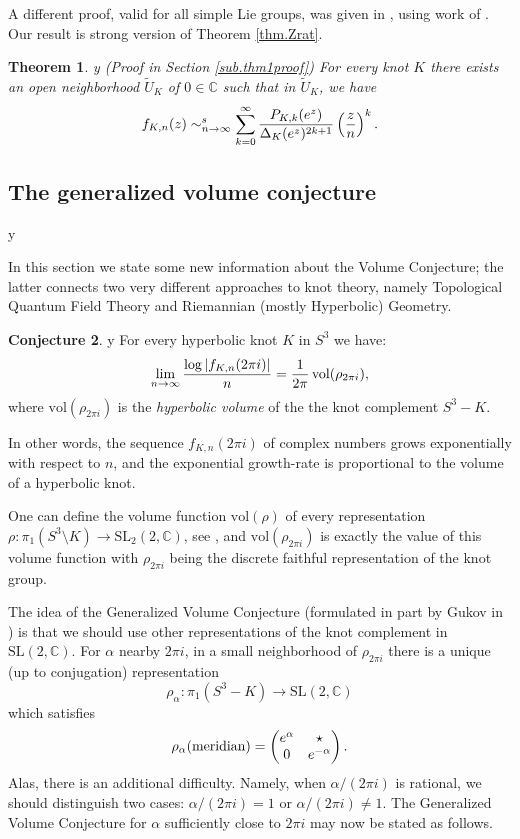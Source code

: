 \documentclass{amsart}
\newtheorem{theorem}{Theorem}[section]
\theoremstyle{definition}
\newtheorem{conjecture}[theorem]{Conjecture}
\def\printname#1{
    \if\draft y
        \smash{\makebox[0pt]{\hspace{-0.5in}
            \raisebox{8pt}{\tt\tiny #1}}}
    \fi
}
\def\lbl#1{\label{#1}\printname{#1}}
\def\BC{\mathbb C}
\def\D{\Delta}
\def\a{\alpha}
\def\mat#1#2#3#4{\left(
\begin{matrix}
 #1 & #2  \\
 #3 & #4
\end{matrix}
\right)}
\def\longto{\longrightarrow}
\def\SL{\mathrm{SL}}
\def\vol{\mathrm{vol}}
\begin{document}
A different proof, valid for all simple Lie groups, was given in \cite{Ga1},
using work of \cite{GK}. Our result is strong version of Theorem
\ref{thm.Zrat}.

\begin{theorem}
\lbl{thm.1} {\rm (Proof in Section \ref{sub.thm1proof})}
For every knot $K$ there exists an open neighborhood
$\tilde U_K$ of $0 \in \BC$ such that in $ \tilde U_K$, we have
\begin{equation}
\lbl{eq.thm1}
f_{K,n}(z) \sim_{n \to \infty}^s \sum_{k=0}^\infty
\frac{P_{K,k}(e^{z})}{\D_K(e^{z})^{2k+1}}
\left(\frac{z}{n}\right)^k.
\end{equation}
\end{theorem}




\subsection{The generalized volume conjecture}
\lbl{sub.volume}


In this section we state some new information about the Volume Conjecture;
the latter connects two very different approaches to knot theory,
namely Topological Quantum Field Theory and Riemannian
(mostly Hyperbolic) Geometry.

\begin{conjecture}
\lbl{conj.vc}\cite{K,MM}
For every hyperbolic knot $K$ in $S^3$ we have:
\begin{equation*}
\lbl{eq.VC}
\lim_{n \to \infty} \frac{\log| f_{K,n}(2 \pi i)|}{n}=
\frac{1}{2 \pi}\, \vol(\rho_{2\pi i}),
\end{equation*}
where $\vol(\rho_{2 \pi i})$ is the {\em hyperbolic volume} of the
 the knot complement $S^3-K$.
\end{conjecture}

In other words, the sequence $f_{K,n}(2 \pi i)$ of complex numbers
grows exponentially with respect to $n$, and the exponential
growth-rate is proportional to the volume of a hyperbolic knot.

One can define the volume function $\vol(\rho)$ of every
representation $\rho: \pi_1(S^3\setminus K)\to \SL_2(2,\BC)$, see
\cite{Du,CCGLS,Th}, and $\vol(\rho_{2\pi i})$ is exactly the value of this
volume function with $\rho_{2\pi i}$ being the discrete faithful
representation of the knot group.

The idea of the Generalized Volume Conjecture (formulated in part by
Gukov in \cite{Gu}) is that we should use other representations of
the knot complement in $\SL(2,\BC)$. For $\a$ nearby $2 \pi i$, in a
small neighborhood of $\rho_{2\pi i}$ there is a unique (up to
conjugation) representation
$$
\rho_{\a}: \pi_1(S^3-K) \longto \SL(2,\BC)
$$
which satisfies
\begin{equation}
\lbl{eq.meridian}
\rho_{\a}(\text{meridian})=
\mat {e^{\a}} {\star} 0 {e^{-\a}} .
\end{equation}
Alas, there is an additional difficulty. Namely, when $\a/(2 \pi i)$ is rational, we should distinguish
two cases: $\a/(2 \pi i)=1 $ or $\a/(2 \pi i)\neq 1$.
The Generalized Volume Conjecture for $\a$ sufficiently close to $2 \pi i$
may now be stated as follows.
\end{document}
